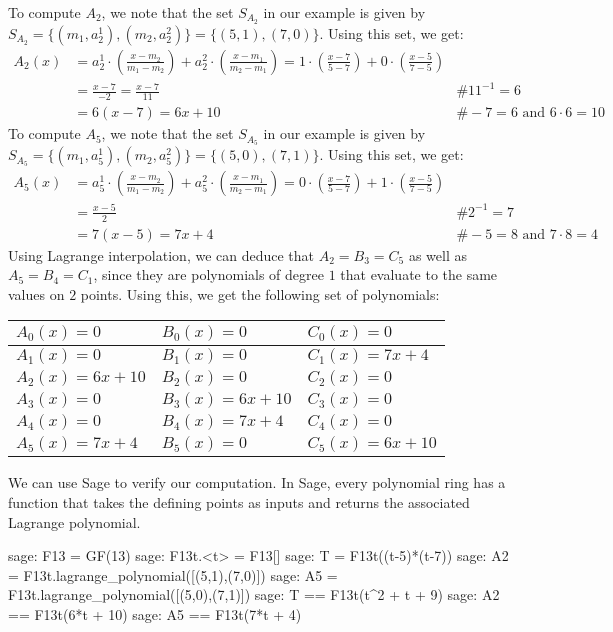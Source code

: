 \begin{example}[3-factorization]
To compute $A_2$, we note that the set $S_{A_2}$ in our example is given by $S_{A_2}=\{(m_1,a^1_2), (m_2,a_2^2)\} = \{(5,1), (7,0)\}$. Using this set, we get:
\begin{align*}
A_2(x) & = a^1_2\cdot \left(\frac{x-m_2}{m_1-m_2}\right) + a^2_2\cdot\left(\frac{x-m_1}{m_2-m_1}\right)
      = 1\cdot\left(\frac{x-7}{5-7}\right) + 0\cdot\left(\frac{x-5}{7-5}\right) \\
    & = \frac{x-7}{-2}
      = \frac{x-7}{11} & \text{\# } 11^{-1}=6 \\
    & = 6(x-7) 
      = 6x + 10 & \text{\# } -7 = 6 \text{ and } 6\cdot 6 = 10
\end{align*}
To compute $A_5$, we note that the set $S_{A_5}$ in our example is given by $S_{A_5}=\{(m_1,a^1_5), (m_2,a^2_5)\} = \{(5,0), (7,1)\}$. Using this set, we get:
\begin{align*}
A_5(x) & = a^1_5\cdot\left(\frac{x-m_2}{m_1-m_2}\right) + a^2_5\cdot\left(\frac{x-m_1}{m_2-m_1}\right)
      = 0\cdot\left(\frac{x-7}{5-7}\right) + 1\cdot\left(\frac{x-5}{7-5}\right) \\
    & = \frac{x-5}{2} & \text{\# } 2^{-1}=7 \\
    & = 7(x-5) 
      = 7x + 4 & \text{\# } -5 = 8 \text{ and } 7\cdot 8 = 4
\end{align*}
Using Lagrange interpolation, we can deduce that $A_2=B_3=C_5$ as well as $A_5=B_4=C_1$, since they are polynomials of degree $1$ that evaluate to the same values on $2$ points. Using this, we get the following set of polynomials:
\begin{center}
\begin{tabular}{|l|l|l|}\hline 
$A_{0}(x)=0 $ &$ B_{0}(x)=0   $ & $C_{0}(x)=0$ \tabularnewline\hline 
$A_1(x)=0 $ &$ B_1(x)=0   $ & $C_1(x)=7x+4$ \tabularnewline\hline 
$A_2(x)=6x+10$ &$ B_2(x)=0$ & $C_2(x)=0$ \tabularnewline\hline 
$A_3(x)=0    $ &$ B_3(x)=6x+10$ & $C_3(x)=0$ \tabularnewline\hline 
$A_4(x)=0$ &$ B_4(x)=7x+4  $ & $C_4(x)=0$ \tabularnewline\hline 
$A_5(x)=7x+4$ &$ B_5(x)=0      $ & $C_5(x)=6x+10$ \tabularnewline\hline 
\end{tabular}
\end{center}
We can use Sage to verify our computation. In Sage, every polynomial ring has a function  that takes the defining points as inputs and returns the associated Lagrange polynomial.
\begin{sagecommandline}
sage: F13 = GF(13)
sage: F13t.<t> = F13[]
sage: T = F13t((t-5)*(t-7))
sage: A2 = F13t.lagrange_polynomial([(5,1),(7,0)])
sage: A5 = F13t.lagrange_polynomial([(5,0),(7,1)])
sage: T == F13t(t^2 + t + 9)
sage: A2 == F13t(6*t + 10)
sage: A5 == F13t(7*t + 4)
\end{sagecommandline}


\end{example}
